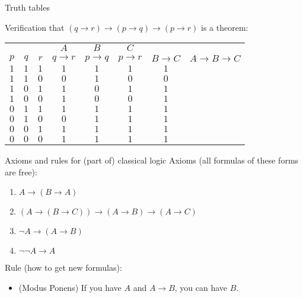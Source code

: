 \documentclass{beamer}
\begin{document}
\begin{frame}{Truth tables}

Verification that $(q\to r)\to (p\to q)\to (p\to r)$ is a theorem:

\vfill

\begin{tabular}{ccc|ccc|cc}
    & & & $A$ & $B$ & $C$ \\
$p$ & $q$ & $r$ & $q\to r$ & $p\to q$ & $p\to r$ & $B\to C$ & $A\to B\to C$ \\
\hline
$1$ & $1$ & $1$ & $1$ & $1$ & $1$ & $1$ & \color{blue}{$1$} \\
$1$ & $1$ & $0$ & $0$ & $1$ & $0$ & $0$ & \color{blue}{$1$} \\
$1$ & $0$ & $1$ & $1$ & $0$ & $1$ & $1$ & \color{blue}{$1$} \\
$1$ & $0$ & $0$ & $1$ & $0$ & $0$ & $1$ & \color{blue}{$1$} \\
$0$ & $1$ & $1$ & $1$ & $1$ & $1$ & $1$ & \color{blue}{$1$} \\
$0$ & $1$ & $0$ & $0$ & $1$ & $1$ & $1$ & \color{blue}{$1$} \\
$0$ & $0$ & $1$ & $1$ & $1$ & $1$ & $1$ & \color{blue}{$1$} \\
$0$ & $0$ & $0$ & $1$ & $1$ & $1$ & $1$ & \color{blue}{$1$}
\end{tabular}

\end{frame}

\begin{frame}{Axioms and rules for (part of) classical logic}
Axioms (all formulas of these forms are free):
\begin{enumerate}
\item $A\to(B\to A)$
\item $(A\to (B\to C)) \to (A\to B) \to (A\to C)$
\item $\lnot A\to (A\to B)$
\item $\lnot\lnot A\to A$
\end{enumerate}
\vfill
Rule (how to get new formulas):
\begin{itemize}
\item (Modus Ponens) If you have $A$ and $A\to B$, you can have $B$.
\end{itemize}
\vfill
\end{frame}
\end{document}
